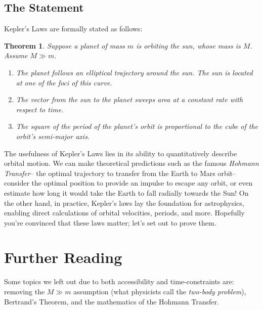 \documentclass[11pt]{article}
\newtheorem{theorem}{Theorem}[section]
\theoremstyle{definition}
\begin{document}
\subsection{The Statement}
Kepler's Laws are formally stated as follows: 
\begin{theorem}\label{KPL}
    Suppose a planet of mass $m$ is orbiting the sun, whose mass is $M$. Assume $M \gg m$.
    \begin{enumerate}
        \item The planet follows an elliptical trajectory around the sun. The sun is located at one of the foci of this curve. 
        \item The vector from the sun to the planet sweeps area at a constant rate with respect to time. 
        \item The square of the period of the planet's orbit is proportional to the cube of the orbit's semi-major axis. 
    \end{enumerate}
\end{theorem} 
The usefulness of Kepler's Laws lies in its ability to quantitatively describe orbital motion. We can make theoretical predictions such as the famous \textit{Hohmann Transfer}– the optimal trajectory to transfer from the Earth to Mars orbit– consider the optimal position to provide an impulse to escape any orbit, or even estimate how long it would take the Earth to fall radially towards the Sun! On the other hand, in practice, Kepler's laws lay the foundation for astrophysics, enabling direct calculations of orbital velocities, periods, and more. Hopefully you're convinced that these laws matter; let's set out to prove them. \cite{Stewart}








\section{Further Reading}
Some topics we left out due to both accessibility and time-constraints are: removing the $M \gg m$ assumption (what physicists call the \textit{two-body problem}), Bertrand's Theorem, and the mathematics of the Hohmann Transfer.



\end{document}
